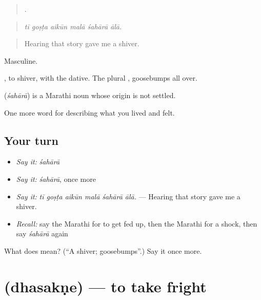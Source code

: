 \begin{quote}
     .
\end{quote}

\begin{quote}
\emph{tī goṣṭa aikūn malā śahārā ālā.}
\end{quote}

\begin{quote}
Hearing that story gave me a shiver.
\end{quote}

Masculine.

 , to shiver, with the dative. The plural , goosebumps all over.

\begin{cousinweb}
\textbf{} (\emph{śahārā}) is a Marathi noun whose origin is not settled.
\end{cousinweb}

\begin{grammarlens}[title={What you've built}]
One more word for describing what you lived and felt.
\end{grammarlens}

\subsection*{Your turn}
\begin{itemize}
\raggedright
  \item \emph{Say it:} \emph{śahārā}
  \item \emph{Say it:} \emph{śahārā}, once more
  \item \emph{Say it:} \emph{tī goṣṭa aikūn malā śahārā ālā.} — Hearing that story gave me a shiver.
  \item \emph{Recall:} say the Marathi for to get fed up, then the Marathi for a shock, then say \emph{śahārā} again
\end{itemize}

\begin{tcolorbox}[breakable,colback=teal!4,colframe=teal!35!black,title={Before you move on}]
What does  mean? (\textquotedblleft{}A shiver; goosebumps\textquotedblright{}.) Say it once more.
\end{tcolorbox}
\section[\texorpdfstring{\mr{धसकणे} (dhasakṇe)}{धसकणे (dhasakṇe)}]{ (dhasakṇe) — to take fright}

